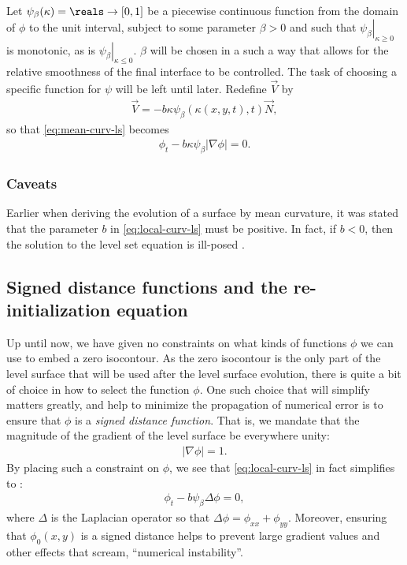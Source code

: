 \documentclass{article}
\begin{document}
Let $\psi_\beta(\kappa) = \reals \to [0,1]$ be a piecewise
continuous function from the domain of $\phi$ to the
unit interval, subject to some parameter $\beta > 0$ and such that
$\left.\psi_\beta\right|_{\kappa\geq 0}$ is monotonic, as is
$\left.\psi_\beta\right|_{\kappa\leq 0}$. $\beta$ will
be chosen in a such a way that allows for the relative smoothness
of the final interface to be controlled. The task of choosing a
specific function for $\psi$ will be left until later. Redefine
$\vec{V}$ by
\begin{align}
  \label{eq:new-vf}
  \vec{V} = -b\kappa \psi_\beta(\kappa(x,y,t),t) \vec{N},
\end{align}
so that \autoref{eq:mean-curv-ls} becomes
\begin{align}
  \label{eq:local-curv-ls}
  \phi_t - b\kappa\psi_\beta\left|\nabla\phi\right| = 0.
\end{align}

\subsubsection{Caveats}
\label{sec:caveats}

Earlier when deriving the evolution of a surface by mean
curvature, it was stated that the parameter $b$ in
\autoref{eq:local-curv-ls} must be positive. In fact, if $b<0$,
then the solution to the level set equation is ill-posed
\cite{osher2003}.

\subsection{Signed distance functions and the re-initialization equation}
\label{sec:sign-dist-funct}

Up until now, we have given no constraints on what kinds of
functions $\phi$ we can use to embed a zero isocontour. As the
zero isocontour is the only part of the level surface that will be
used after the level surface evolution, there is quite a bit of
choice in how to select the function $\phi$. One such choice that
will simplify matters greatly, and help to minimize the
propagation of numerical error is to ensure that $\phi$ is a
\emph{signed distance function}. That is, we mandate that the
magnitude of the gradient of the level surface be everywhere
unity:
\begin{align}
  \left|\nabla \phi\right| = 1.
\end{align}
By placing such a constraint on $\phi$, we see that
\autoref{eq:local-curv-ls} in fact simplifies to \cite{osher2003}:
\begin{align}
  \phi_t - b\psi_\beta\Delta \phi = 0,
\end{align}
where $\Delta$ is the Laplacian operator so that $\Delta \phi =
\phi_{xx} + \phi_{yy}$. Moreover, ensuring that $\phi_0(x,y)$
is a signed distance helps to prevent large gradient values and
other effects that scream, ``numerical instability''. 
\end{document}
